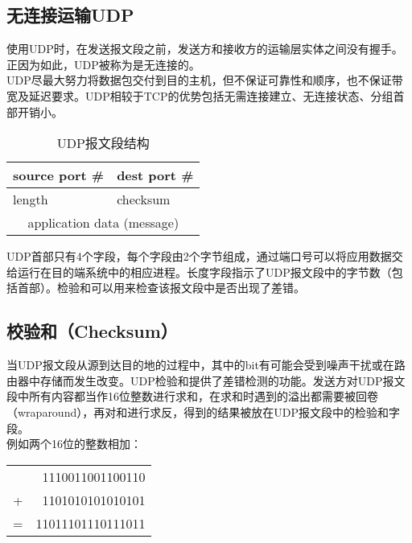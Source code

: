 \subsection{无连接运输UDP}

使用UDP时，在发送报文段之前，发送方和接收方的运输层实体之间没有握手。正因为如此，UDP被称为是无连接的。\\

UDP尽最大努力将数据包交付到目的主机，但不保证可靠性和顺序，也不保证带宽及延迟要求。UDP相较于TCP的优势包括无需连接建立、无连接状态、分组首部开销小。\\

\begin{table}[H]
	\centering
	\begin{tabular}{|p{3cm}<{\centering}|p{3cm}<{\centering}|}
		\hline
		source port \# & dest port \#                    \\
		\hline
		length         & checksum                        \\
		\hline
		\multicolumn{2}{|c|}{application data (message)} \\
		\hline
	\end{tabular}
	\caption{UDP报文段结构}
\end{table}

UDP首部只有4个字段，每个字段由2个字节组成，通过端口号可以将应用数据交给运行在目的端系统中的相应进程。长度字段指示了UDP报文段中的字节数（包括首部）。检验和可以用来检查该报文段中是否出现了差错。\\

\subsection{校验和（Checksum）}

当UDP报文段从源到达目的地的过程中，其中的bit有可能会受到噪声干扰或在路由器中存储而发生改变。UDP检验和提供了差错检测的功能。发送方对UDP报文段中所有内容都当作16位整数进行求和，在求和时遇到的溢出都需要被回卷（wraparound），再对和进行求反，得到的结果被放在UDP报文段中的检验和字段。\\

例如两个16位的整数相加：

\begin{table}[H]
	\centering
	\begin{tabular}{cD{.}{.}{3}}
		  & 1110011001100110  \\
		+ & 1101010101010101  \\
		\hline
		= & 11011101110111011
	\end{tabular}
\end{table}

